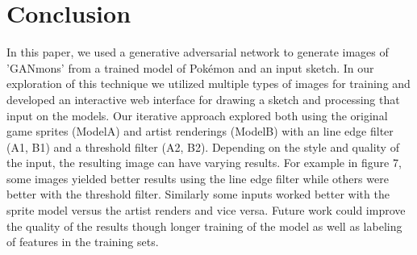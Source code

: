 \documentclass[sigchi]{acmart}
\begin{document}
\section{Conclusion}


In this paper, we used a generative adversarial network to generate images of 'GANmons' from a trained model of Pokémon and an input sketch. In our exploration of this technique we utilized multiple types of images for training and developed an interactive web interface for drawing a sketch and processing that input on the models. Our iterative approach explored both using the original game sprites (ModelA) and artist renderings (ModelB) with an line edge filter (A1, B1) and a threshold filter (A2, B2). Depending on the style and quality of the input, the resulting image can have varying results. For example in figure 7, some images yielded better results using the line edge filter while others were better with the threshold filter. Similarly some inputs worked better with the sprite model versus the artist renders and vice versa. Future work could improve the quality of the results though longer training of the model as well as labeling of features in the training sets.


 
\end{document}
